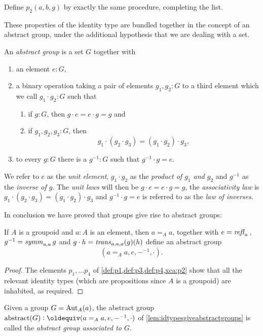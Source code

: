 \begin{xca}\label{xca:p2}
    Define $p_2(a,b,g)$ %
by exactly the same procedure, completing the list.
\end{xca}


These properties of the identity type are bundled together in the concept of an abstract group, under the additional hypothesis that we are dealing with a set.

  \begin{definition}\label{def:abstractgroup}
    An \emph{abstract group} is a set $G$ together with
\begin{enumerate}
\item an element $e:G$,
\item a binary operation taking a pair of elements $g_1,g_2:G$ to a third element which we call $g_1\cdot g_2:G$ such that
  \begin{enumerate}
  \item %
if $g:G$, then $g\cdot e=e\cdot g=g$ and
  \item %
if $g_1,g_2,g_3:G$, then
$$g_1\cdot(g_2\cdot g_3)=(g_1\cdot g_2)\cdot g_3,$$
  \end{enumerate}
\item %
to every $g:G$ there is a $g^{-1}:G$ such that $%
g^{-1}\cdot g=e$.
\end{enumerate}
We refer to $e$ as the \emph{unit element}, $g_1\cdot g_2$ as the \emph{product of $g_1$ and $g_2$} and $g^{-1}$ as the \emph{inverse of $g$}.  The \emph{unit laws} will then be $g\cdot e=e\cdot g=g$, the \emph{associativity law} is $g_1\cdot(g_2\cdot g_3)=(g_1\cdot g_2)\cdot g_3$ and $%
g^{-1}\cdot g=e$ is referred to as the \emph{law of inverses}.
  \end{definition}

In conclusion we have proved that groups give rise to abstract groups:
\newcommand{\abstr}{\mathrm{abstract}}
  \begin{lemma}\label{lem:idtypesgiveabstractgroups}
    If $A$ is a groupoid %
and $a:A$ is an element, then $a=_Aa$, together with $e=\mathop{{\it refl}_{a}}{}$, $g^{-1}=\mathop{\mathit{symm}}_{a,a}g$ and $g\cdot h=\mathop{\mathit{trans}}_{a,a,a}(g)(h)$ define an abstract group
$$(a=_Aa,e,{-}^{-1},\cdot).$$
  \end{lemma}
  \begin{proof}
    The elements $p_1,\dots p_4$ of \cref{def:p1,def:p3,def:p4,xca:p2} show that all the relevant identity types (which are propositions since $A$ is a groupoid) are inhabited, as required.
  \end{proof}
  \begin{definition}
    Given a group $G=\mathrm{Aut}_A(a)$, the abstract group $\abstr(G)\defequi (a=_Aa,e,{-}^{-1},\cdot)$ of \cref{lem:idtypesgiveabstractgroups} is called the \emph{abstract group associated to $G$}.
  \end{definition}

